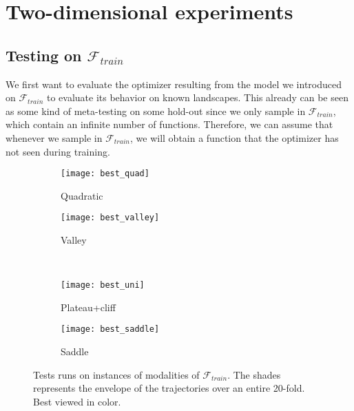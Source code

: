 	\section{Two-dimensional experiments}
	{
		\subsection{Testing on $\mathcal{F}_{train}$}
		We first want to evaluate the optimizer resulting from the model we introduced on $\mathcal{F}_{train}$ to evaluate its behavior on known landscapes. This already can be seen as some kind of meta-testing on some hold-out since we only sample in $\mathcal{F}_{train}$, which contain an infinite number of functions. Therefore, we can assume that whenever we sample in $\mathcal{F}_{train}$, we will obtain a function that the optimizer has not seen during training. 
		
		
		\begin{figure}[h!]
			\centering
			\begin{subfigure}[b]{0.45\linewidth}
			{
				\centering
				\texttt{[image: best\_quad]}
				\caption{Quadratic}
				\label{fig::fquad_eval}
			}
			\end{subfigure}\hfill
			\begin{subfigure}[b]{0.45\linewidth}
			{
				\centering
				\texttt{[image: best\_valley]}
				\caption{Valley}
				\label{fig::valley_eval}
			}
			\end{subfigure}\\
			\begin{subfigure}[b]{0.45\linewidth}
			{
				\centering
				\texttt{[image: best\_uni]}
				\caption{Plateau+cliff}
				\label{fig::uni_eval}
			}
			\end{subfigure}\hfill
			\begin{subfigure}[b]{0.45\linewidth}
			{
				\centering
				\texttt{[image: best\_saddle]}
				\caption{Saddle}
				\label{fig::saddle}
			}
			\end{subfigure}
			\caption[Tests runs on instances of modalities of $\mathcal{F}_{train}$]{Tests runs on instances of modalities of $\mathcal{F}_{train}$. The shades represents the envelope of the trajectories over an entire 20-fold. Best viewed in color.}
			\label{fig::ftrain_test}
		\end{figure}
		
}
